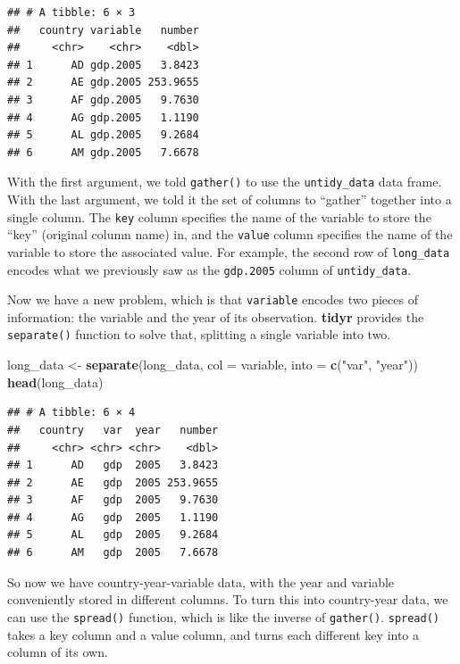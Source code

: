 \documentclass[12pt,oneside,openany]{book}
\newenvironment{Shaded}{\begin{snugshade}}{\end{snugshade}}
\newcommand{\KeywordTok}[1]{\textcolor[rgb]{0.13,0.29,0.53}{\textbf{#1}}}
\newcommand{\DataTypeTok}[1]{\textcolor[rgb]{0.13,0.29,0.53}{#1}}
\newcommand{\StringTok}[1]{\textcolor[rgb]{0.31,0.60,0.02}{#1}}
\newcommand{\NormalTok}[1]{#1}
\begin{document}
\begin{verbatim}
## # A tibble: 6 × 3
##   country variable   number
##     <chr>    <chr>    <dbl>
## 1      AD gdp.2005   3.8423
## 2      AE gdp.2005 253.9655
## 3      AF gdp.2005   9.7630
## 4      AG gdp.2005   1.1190
## 5      AL gdp.2005   9.2684
## 6      AM gdp.2005   7.6678
\end{verbatim}

With the first argument, we told \texttt{gather()} to use the
\texttt{untidy\_data} data frame. With the last argument, we told it the
set of columns to ``gather'' together into a single column. The
\texttt{key} column specifies the name of the variable to store the
``key'' (original column name) in, and the \texttt{value} column
specifies the name of the variable to store the associated value. For
example, the second row of \texttt{long\_data} encodes what we
previously saw as the \texttt{gdp.2005} column of \texttt{untidy\_data}.

Now we have a new problem, which is that \texttt{variable} encodes two
pieces of information: the variable and the year of its observation.
\textbf{tidyr} provides the \texttt{separate()} function to solve that,
splitting a single variable into two.

\begin{Shaded}
\begin{Highlighting}[]
\NormalTok{long_data <-}\StringTok{ }\KeywordTok{separate}\NormalTok{(long_data,}
                      \DataTypeTok{col =}\NormalTok{ variable,}
                      \DataTypeTok{into =} \KeywordTok{c}\NormalTok{(}\StringTok{"var"}\NormalTok{, }\StringTok{"year"}\NormalTok{))}
\KeywordTok{head}\NormalTok{(long_data)}
\end{Highlighting}
\end{Shaded}

\begin{verbatim}
## # A tibble: 6 × 4
##   country   var  year   number
##     <chr> <chr> <chr>    <dbl>
## 1      AD   gdp  2005   3.8423
## 2      AE   gdp  2005 253.9655
## 3      AF   gdp  2005   9.7630
## 4      AG   gdp  2005   1.1190
## 5      AL   gdp  2005   9.2684
## 6      AM   gdp  2005   7.6678
\end{verbatim}

So now we have country-year-variable data, with the year and variable
conveniently stored in different columns. To turn this into country-year
data, we can use the \texttt{spread()} function, which is like the
inverse of \texttt{gather()}. \texttt{spread()} takes a key column and a
value column, and turns each different key into a column of its own.
\end{document}
